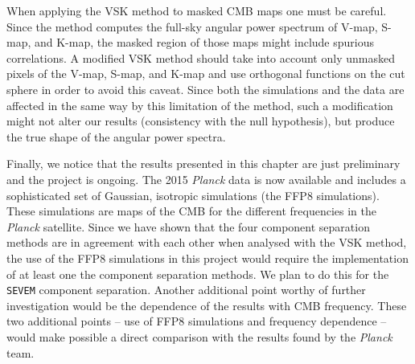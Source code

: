 When applying the VSK method to masked CMB maps one must be careful. Since the method computes the full-sky angular power spectrum of V-map, S-map, and K-map, the masked region of those maps might include spurious correlations. %
A modified VSK method should take into account only unmasked pixels of the V-map, S-map, and K-map and use orthogonal functions on the cut sphere in order to avoid this caveat. Since both the simulations and the data are affected in the same way by this limitation of the method, such a modification might not alter our results (consistency with the null hypothesis), but produce the true shape of the angular power spectra.  

Finally, we notice that %
the results presented in this chapter are just preliminary and the project is ongoing. The 2015 \textit{Planck} data is now available and includes a sophisticated set of Gaussian, isotropic simulations  (the FFP8 simulations). These simulations are maps of the CMB for the different frequencies in the \textit{Planck} satellite. Since we have shown that the four component separation methods are in agreement with each other when analysed with the VSK method, the use of the FFP8 simulations in this project would require the implementation of at least one the component separation methods. We plan to do this for the \texttt{SEVEM} component separation. Another additional point worthy of further investigation would be the dependence of the results with CMB frequency. These two additional points -- use of FFP8 simulations and frequency dependence -- would make possible a direct comparison with the results found by the \textit{Planck} team. 
